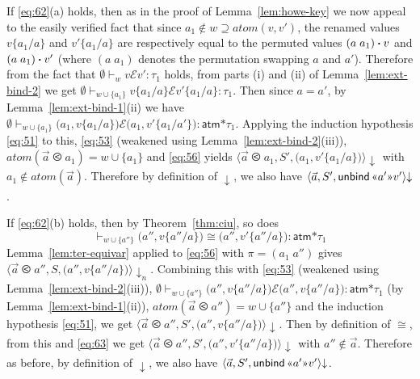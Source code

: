 \documentclass{LMCS}
\theoremstyle{plain}
\theoremstyle{definition}
\newcommand{\act}{\mathbin{\mbox{\boldmath$\cdot$}}}
\newcommand{\atm}[1][a]{#1}
\newcommand{\ATM}{\kw{atm}}
\newcommand{\atoms}{\mathit{atom}}
\newcommand{\BINDVAL}[2]{\mathopen{\text{\normalfont\guillemotleft}}#1
  \mathclose{\text{\normalfont\guillemotright}}#2}
\newcommand{\config}[3]{\langle#1, #2, #3\rangle}
\newcommand{\ent}{\vdash}
\newcommand{\er}{\mathrel{\mathcal{E}}}
\newcommand{\LP}{\mathopen{\kw{(}}}
\newcommand{\kw}[1]{\mathsf{#1}}
\newcommand{\ofty}{:}
\newcommand{\opeq}{\cong}
\newcommand{\ords}{\olessthan}\newcommand{\PAIR}[2]{\LP#1\mathbin{\kw{,}}#2\RP}
\newcommand{\PRODTY}{\mathbin{\kw{*}}}
\newcommand{\rename}[2]{\{#2/#1\}}
\newcommand{\RP}{\mathclose{\kw{)}}}
\newcommand{\s}[1][a]{\vec{#1}}
\newcommand{\stk}[1][S]{#1}
\newcommand{\swap}[2]{(#1\;#2)}
\newcommand{\terminates}[1][]{{\downarrow_{#1}}}
\newcommand{\ty}{\tau}
\newcommand{\UNBIND}{\kw{unbind}}
\newcommand{\val}[1][v]{#1}
\newcommand{\w}[1][w]{#1}
\begin{document}
  If \eqref{eq:62}(a) holds, then as in the proof of
  Lemma~\ref{lem:howe-key} we now appeal to the easily verified fact
  that since $\atm_1\notin\w\supseteq\atoms(\val,\val')$, the renamed
  values $\val\rename{\atm}{\atm_1}$ and $\val'\rename{\atm}{\atm_1}$
  are respectively equal to the permuted values
  $\swap{\atm}{\atm_1}\act\val$ and $\swap{\atm}{\atm_1}\act \val'$
  (where $\swap{\atm}{\atm_1}$ denotes the permutation swapping $\atm$
  and $\atm'$).  Therefore from the fact that $\emptyset\ent_{\w}
  \val\er \val'\ofty\ty_1$ holds, from parts (i) and (ii) of
  Lemma~\ref{lem:ext-bind-2} we get $\emptyset\ent_{\w\cup\{\atm_1\}}
  \val\rename{\atm}{\atm_1} \er \val'\rename{\atm}{\atm_1}
  \ofty\ty_1$.  Then since $\atm=\atm'$, by
  Lemma~\ref{lem:ext-bind-1}(ii) we have
  $\emptyset\ent_{\w\cup\{\atm_1\}}
  \PAIR{\atm_1}{\val\rename{\atm}{\atm_1}} \er
  \PAIR{\atm_1}{\val'\rename{\atm'}{\atm_1}} \ofty \ATM\PRODTY\ty_1$.
  Applying the induction hypothesis \eqref{eq:51} to this,
  \eqref{eq:53} (weakened using Lemma~\ref{lem:ext-bind-2}(iii)),
  $\atoms(\s\ords\atm_1) = \w\cup\{\atm_1\}$ and \eqref{eq:56} yields
  $\config{\s\ords
    \atm_1}{\stk'}{\PAIR{\atm_1}{\val'\rename{\atm}{\atm_1}}}\terminates$
  with $\atm_1\notin\atoms(\s)$.  Therefore by definition of
  $\terminates$, we also have
  $\config{\s}{\stk'}{\UNBIND\,\BINDVAL{\atm'}{\val'}}\terminates$.
  
    If \eqref{eq:62}(b) holds, then by Theorem~\ref{thm:ciu}, so does
  \begin{equation}
    \label{eq:63}
    {}\ent_{\w\cup\{\atm''\}} \PAIR{\atm''}{\val\rename{\atm}{\atm''}}
    \opeq
    \PAIR{\atm''}{\val'\rename{\atm}{\atm''}} \ofty\ATM\PRODTY\ty_1 
  \end{equation}
  Lemma~\ref{lem:ter-equivar} applied to \eqref{eq:56} with $\pi=
  \swap{\atm_1}{\atm''}$ gives $\config{\s\ords
    \atm''}{\stk}{\PAIR{\atm''}{\val\rename{\atm}{\atm''}}}\terminates[n]$.
  Combining this with \eqref{eq:53} (weakened using
  Lemma~\ref{lem:ext-bind-2}(iii)), $\emptyset\ent_{\w\cup\{\atm''\}}
  \PAIR{\atm''}{\val\rename{\atm}{\atm''}} \er
  \PAIR{\atm''}{\val\rename{\atm}{\atm''}} \ofty \ATM\PRODTY\ty_1$ (by
  Lemma~\ref{lem:ext-bind-1}(ii)),
  $\atoms(\s\ords\atm'')=\w\cup\{\atm''\}$ and the induction
  hypothesis \eqref{eq:51}, we get $\config{\s\ords
    \atm''}{\stk'}{\PAIR{\atm''}{\val\rename{\atm}{\atm''}}}\terminates$.
  Then by definition of $\opeq$, from this and \eqref{eq:63} we get
  $\config{\s\ords\atm''}{\stk'}{\PAIR{\atm''}
    {\val'\rename{\atm}{\atm''}}}\terminates$ with $\atm''\notin\s$.
  Therefore as before, by definition of $\terminates$, we also have
  $\config{\s}{\stk'}{\UNBIND\,\BINDVAL{\atm'}{\val'}}\terminates$.
\end{document}
